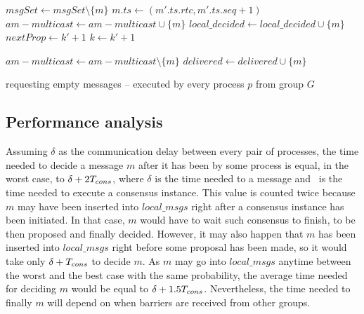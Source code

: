 \documentclass[times, 10pt]{article}
\begin{document}
\begin{algorithm}
\begin{distribalgo}[1]
\blankline
{}
    \STATE $msgSet \leftarrow msgSet \setminus \{m\}$
      \STATE $m.ts \leftarrow (m'.ts.rtc, m'.ts.seq + 1)$ \label{algline:chgts}
    \ENDIF     
     \label{algline:checkcons}
      \STATE $am-multicast \leftarrow am-multicast \cup \{m\}$
    \ENDIF
    \STATE $local\_decided \leftarrow local\_decided \cup \{m\}$
      \STATE {} \label{algline:barreq} 
    \ELSE
      \STATE {} 
    \ENDIF
  \ENDINDENT
  \STATE $nextProp \leftarrow k' + 1$
  \STATE $k \leftarrow k' + 1$
\ENDINDENT

\blankline
{}
  \STATE $am-multicast \leftarrow am-multicast \setminus \{m\}$
    \STATE {}
  \ENDIF
  \STATE $delivered \leftarrow delivered \cup \{m\}$

\blankline
\ENDINDENT

\caption{ requesting empty messages -- executed by every process $p$ from group $G$}
\label{algorithm:nullondemand}
\end{distribalgo}
\end{algorithm}
 
 \subsection{Performance analysis}
 
 Assuming $\delta$ as the communication delay between every pair of processes, the time needed to decide a message $m$ after it has been \amcast{} by some process is equal, in the worst case, to $\delta + 2T_{cons}$, where $\delta$ is the time needed to \rmdel{} a message and \tcons\ is the time needed to execute a consensus instance. This value is counted twice because $m$ may have been inserted into $local\_msgs$ right after a consensus instance has been initiated. In that case, $m$ would have to wait such consensus to finish, to be then proposed and finally decided. However, it may also happen that $m$ has been inserted into $local\_msgs$ right before some proposal has been made, so it would take only $\delta + T_{cons}$ to decide $m$. As $m$ may go into $local\_msgs$ anytime between the worst and the best case with the same probability, the average time needed for deciding $m$ would be equal to $\delta + 1.5T_{cons}$. Nevertheless, the time needed to finally \cons{} $m$ will depend on when barriers are received from other groups.
\end{document}
